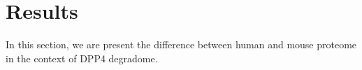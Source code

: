 \section{Results}
In this section, we are present the difference between human and mouse proteome in the context of DPP4 degradome. 

